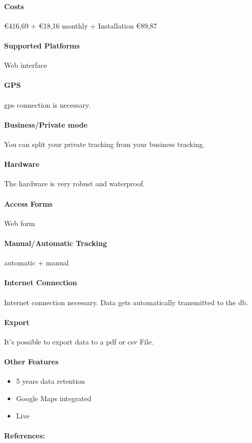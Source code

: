 \paragraph{Costs}\euro 416,69 + \euro 18,16 monthly + Installation \euro 89,87 
\paragraph{Supported Platforms} Web interface
\paragraph{GPS} \gls{gps} connection is necessary.
\paragraph{Business/Private mode}You can split your private tracking from your business tracking.
\paragraph{Hardware}The hardware is very robust and waterproof.
\paragraph{Access Forms}Web form
\paragraph{Manual/Automatic Tracking}automatic + manual
\paragraph{Internet Connection}Internet connection necessary.
Data gets automatically  transmitted to the \gls{db}.
\paragraph{Export}It’s possible to export data to a \gls{pdf} or \gls{csv} File.
\paragraph{Other Features}
\begin{itemize}
\item 5 years data retention  
\item Google Maps integrated
\item Live
\end{itemize}
\paragraph{References:} \cite{GPS_Log_Book_LIVE}
\newpage

